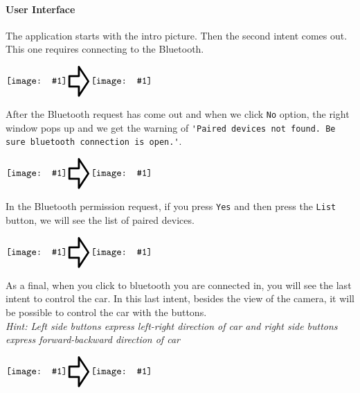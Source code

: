 \documentclass[11pt]{article}
\newcommand*{\vimage}[1]{\vcenter{\hbox{\texttt{[image: \#1]}}}}
\newcommand*{\vpointer}{\vcenter{\hbox{\scalebox{2}{\Huge\pointer}}}}
\begin{document}
\vspace{0.2cm}

\paragraph{User Interface}
\begin{flushleft}
The application starts with the intro picture. Then the second intent comes out. This one requires connecting to the Bluetooth.
\end{flushleft}
\vspace{0.1cm}
\begin{center}
$\vimage{intro.png}\vpointer
\vimage{blue_opt.png}$\\
\end{center}

\vspace{0.2cm}
\begin{flushleft}
After the Bluetooth request has come out and when we click \verb|No| option, the right window pops up and we get the warning of \verb|'Paired devices not found. Be sure bluetooth connection is open.'|.
\end{flushleft}
\vspace{0.1cm}
\begin{center}
$\vimage{blue_opt.png}\vpointer  
\vimage{2.png}$\\
\end{center}
\pagebreak

\vspace{0.2cm}
\begin{flushleft}
In the Bluetooth permission request, if you press \verb|Yes| and then press the \verb|List| button, we will see the list of paired devices.
\end{flushleft}
\vspace{0.1cm}
\begin{center}
$\vimage{blue_opt.png}\vpointer  
\vimage{blue_yes.png}$
\end{center}
\vspace{0.2cm}
\begin{flushleft}
As a final, when you click to bluetooth you are connected in, you will see the last intent to control the car. In this last intent, besides the view of the camera, it will be possible to control the car with the buttons.\\
\vspace{0.05cm}
\emph{Hint: Left side buttons express left-right direction of car and right side buttons express forward-backward direction of car}
\end{flushleft}
\vspace{0.1cm}
\begin{center}
$\vimage{blue_yes.png}\vpointer  
\vimage{main_screen.png}$
\end{center}
\vspace{0.2cm}
\end{document}
